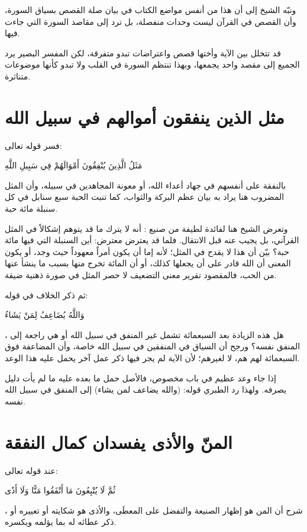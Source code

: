 ونبّه الشيخ إلى أن هذا من أنفس مواضع الكتاب في بيان صلة القصص بسياق السورة، وأن القصص في القرآن ليست وحدات منفصلة، بل ترد إلى مقاصد السورة التي جاءت فيها.

\begin{fawaid}
قد تتخلل بين الآية وأختها قصص واعتراضات تبدو متفرقة، لكن المفسر البصير يرد الجميع إلى مقصد واحد يجمعها، وبهذا تنتظم السورة في القلب ولا تبدو كأنها موضوعات متناثرة.
\end{fawaid}

\section{مثل الذين ينفقون أموالهم في سبيل الله}
فسر  قوله تعالى: \begin{ayah}مَثَلُ الَّذِينَ يُنْفِقُونَ أَمْوَالَهُمْ فِي سَبِيلِ اللَّهِ\end{ayah} بالنفقة على أنفسهم في جهاد أعداء الله، أو معونة المجاهدين في سبيله، وأن المثل المضروب هنا يراد به بيان عظم البركة والثواب، كما تنبت الحبة سبع سنابل في كل سنبلة مائة حبة.

وتعرض الشيخ هنا لفائدة لطيفة من صنيع : أنه لا يترك ما قد يتوهم إشكالاً في المثل القرآني، بل يجيب عنه قبل الانتقال. فلما قد يعترض معترض: أين السنبلة التي فيها مائة حبة؟ بيّن أن هذا لا يقدح في المثل؛ لأنه إما أن يكون أمراً معهوداً حيث وجد، أو يكون المعنى أن الله قادر على أن يجعلها كذلك، أو أن المائة تخرج منها بسبب ما ينشأ عنها من الحب، فالمقصود تقرير معنى التضعيف لا حصر المثل في صورة ذهنية ضيقة.

ثم ذكر الخلاف في قوله: \begin{ayah}وَاللَّهُ يُضَاعِفُ لِمَنْ يَشَاءُ\end{ayah}، هل هذه الزيادة بعد السبعمائة تشمل غير المنفق في سبيل الله أو هي راجعة إلى المنفق نفسه؟ ورجح أن السياق في المنفقين في سبيل الله خاصة، وأن المضاعفة فوق السبعمائة لهم هم، لا لغيرهم؛ لأن الآية لم يجر فيها ذكر عمل آخر يحمل عليه هذا الوعد.

\begin{fawaid}
إذا جاء وعد عظيم في باب مخصوص، فالأصل حمل ما بعده عليه ما لم يأت دليل يصرفه. ولهذا رد الطبري قوله: (والله يضاعف لمن يشاء) إلى المنفق في سبيل الله نفسه.
\end{fawaid}

\section{المنّ والأذى يفسدان كمال النفقة}
عند قوله تعالى: \begin{ayah}ثُمَّ لَا يُتْبِعُونَ مَا أَنْفَقُوا مَنًّا وَلَا أَذًى\end{ayah}، شرح  أن المن هو إظهار الصنيعة والتفضل على المعطَى، والأذى هو شكايته أو تعييره أو ذكر عطائه له بما يؤلمه ويكسره.

